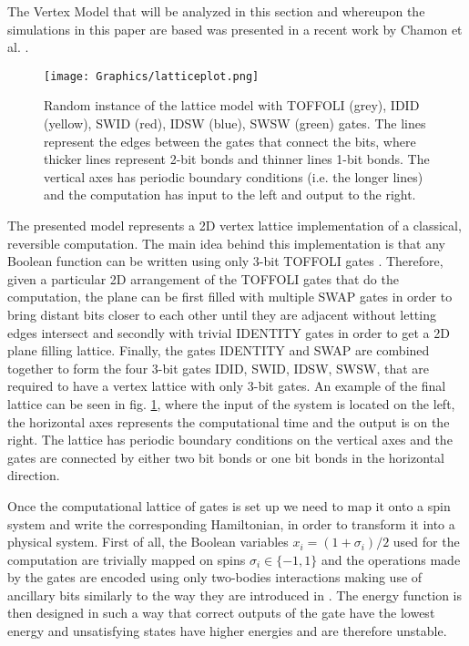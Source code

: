 The Vertex Model that will be analyzed in this section and whereupon the simulations in this paper are based was presented in a recent work by Chamon et al. \cite{Chamon}.

\begin{figure}[bhtp]
  \centering
  \texttt{[image: Graphics/latticeplot.png]}
  \caption{Random instance of the lattice model with TOFFOLI (grey), IDID (yellow), SWID (red), IDSW (blue), SWSW (green) gates. The lines represent the edges between the gates that connect the bits, where thicker lines represent 2-bit bonds and thinner lines 1-bit bonds. The vertical axes has periodic boundary conditions (i.e. the longer lines) and the computation has input to the left and output to the right. \label{fig:latticeplot}}
\end{figure}

The presented model represents a 2D vertex lattice implementation of a classical, reversible computation.
The main idea behind this implementation is that any Boolean function can be written using only 3-bit TOFFOLI gates \cite{Toffoli}.
Therefore, given a particular 2D arrangement of the TOFFOLI gates that do the computation, the plane can be first filled with multiple SWAP gates in order to bring distant bits closer to each other until they are adjacent without letting edges intersect and secondly with trivial IDENTITY gates in order to get a 2D plane filling lattice. Finally, the gates IDENTITY and SWAP are combined together to form the four 3-bit gates IDID, SWID, IDSW, SWSW, that are required to have a vertex lattice with only 3-bit gates.
An example of the final lattice can be seen in fig. \ref{fig:latticeplot}, where the input of the system is located on the left, the horizontal axes represents the computational time and the output is on the right.
The lattice has periodic boundary conditions on the vertical axes and the gates are connected by either two bit bonds or one bit bonds in the horizontal direction.

Once the computational lattice of gates is set up we need to map it onto a spin system and write the corresponding Hamiltonian, in order to transform it into a physical system.
First of all, the Boolean variables $x_i = (1+\sigma_i)/2$ used for the computation are trivially mapped on spins $\sigma_i \in \{ -1, 1 \}$ and the operations made by the gates are encoded using only two-bodies interactions making use of ancillary bits similarly to the way they are introduced in \cite{Biamonte}.
The energy function is then designed in such a way that correct outputs of the gate have the lowest energy and unsatisfying states have higher energies and are therefore unstable.

